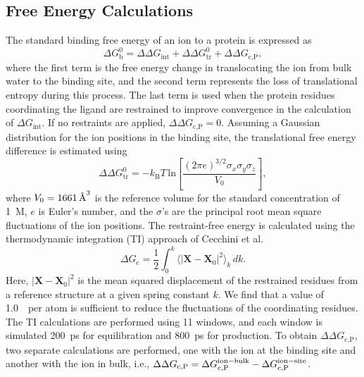 \subsection{Free Energy Calculations}
The standard binding free energy of an ion to a protein is expressed as
\begin{equation}
    \Delta G_{\text{b}}^{0} = \Delta\Delta G_{\text{int}} + \Delta\Delta G_{\text{tr}}^{0} +
    \Delta\Delta 
G_{\text{c,P}} ,
\end{equation}
where the first term is the free energy change in translocating the ion from bulk water
to the binding site, and the second term represents the loss of translational entropy during this
process. The last term is used when the protein residues coordinating the ligand are restrained 
to improve convergence in the calculation of $\Delta G_{\text{int}}$.
If no restraints are applied, $\Delta\Delta G_{\text{c,P}}=0$.
Assuming a Gaussian distribution for the ion positions in the binding site, the translational 
free energy difference is estimated using~\cite{Carlsson2005}
\begin{equation}
    \Delta\Delta G_{\text{tr}}^{0} = -k_{\text{B}}T\, \text{ln} \left[\frac{(2\pi 
e)^{3/2}\sigma_{x}\sigma_{y}\sigma_{z}}{V_{0}} \right],
    \label{eq:tr}
\end{equation}
where $V_{0}=1661\, \textup{\AA}^3$ is the reference volume for the standard concentration of 1~M, 
$e$ is Euler's number, and the $\sigma$'s are the principal root mean square fluctuations of the ion 
positions. The restraint-free energy is calculated using the thermodynamic integration 
(TI) approach of Cecchini et al.~\cite{Cecchini2009}
\begin{equation}
    \Delta G_{\text{c}} = \frac{1}{2} \int_{0}^{k} \langle |\pmb X- \pmb X_{0}|^2 \rangle_{k}\, dk.
\end{equation}
Here, $|\pmb X- \pmb X_{0}|^2$ is the mean squared displacement of the 
restrained residues from a reference structure at a given spring constant $k$. We find 
that a value of 1.0~\spring\ per atom is sufficient to reduce the fluctuations of the 
coordinating residues. The TI calculations are performed using 11 windows, and each window is 
simulated 200~ps for equilibration and 800~ps for production. To obtain $\Delta\Delta 
G_{\text{c,P}}$, two separate calculations are performed, one with the ion at the 
binding site and another with the ion in bulk, i.e., $\Delta\Delta G_{\text{c,P}} = \Delta
G_{\text{c,P}}^{\rm ion-bulk} - \Delta G_{\text{c,P}}^{\rm ion-site}$.

